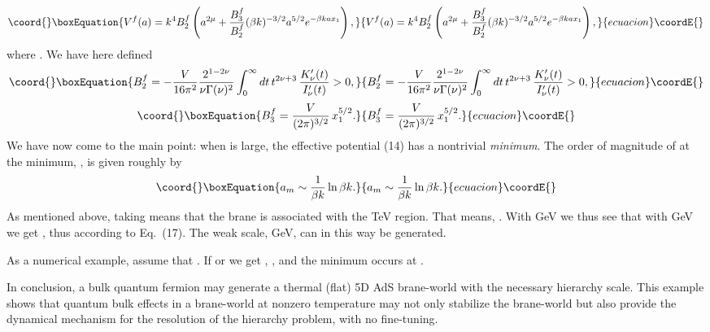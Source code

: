 \documentclass[a4paper,12pt]{article}
\begin{document}
\begin{equation}\coord{}\boxEquation{
V^f(a)=k^4 B_2^f\left( a^{2\mu}+\frac{B_3^f}{B_2^f}(\beta k)^{-3/2}a^{5/2}e^{-\beta kax_1} \right),
}{
V^f(a)=k^4 B_2^f\left( a^{2\mu}+\frac{B_3^f}{B_2^f}(\beta k)^{-3/2}a^{5/2}e^{-\beta kax_1} \right),
}{ecuacion}\coordE{}\end{equation}
\label{14}
where \coordHE{}. We have here defined
\begin{equation}\coord{}\boxEquation{
B_2^f=-\frac{V}{16\pi^2}\frac{2^{1-2\nu}}{\nu \Gamma(\nu)^2}\int_0^\infty dt\,t^{2\nu+3}\,\frac{K_\nu '(t)}{I_\nu '(t)} >0,
}{
B_2^f=-\frac{V}{16\pi^2}\frac{2^{1-2\nu}}{\nu \Gamma(\nu)^2}\int_0^\infty dt\,t^{2\nu+3}\,\frac{K_\nu '(t)}{I_\nu '(t)} >0,
}{ecuacion}\coordE{}\end{equation}
\label{15}
\begin{equation}\coord{}\boxEquation{
B_3^f=\frac{V}{(2\pi)^{3/2}}\,x_1^{5/2}.
}{
B_3^f=\frac{V}{(2\pi)^{3/2}}\,x_1^{5/2}.
}{ecuacion}\coordE{}\end{equation}
\label{16}
We have now come to the main point: when \coordHE{} is large, the effective potential (14) has a nontrivial {\it minimum}. The order of magnitude of \coordHE{} at the minimum, \coordHE{}, is given roughly by
\begin{equation}\coord{}\boxEquation{
a_m \sim \frac{1}{\beta k} \ln \beta k.
}{
a_m \sim \frac{1}{\beta k} \ln \beta k.
}{ecuacion}\coordE{}\end{equation}
\label{17}
As mentioned above, taking \coordHE{} means that the \myHighlight{$\phi=\pi$}\coordHE{} brane is associated with the TeV region. That means, \coordHE{}. With \coordHE{} GeV we thus see that with \coordHE{} GeV we get \coordHE{}, thus \coordHE{} according to Eq.~(17). The weak scale, \coordHE{} GeV, can in this way be generated.

As a numerical example, assume that \coordHE{}. If \coordHE{} or \coordHE{} we get \coordHE{}, \coordHE{}, and the minimum occurs at \coordHE{}. 

In conclusion, a bulk quantum fermion may generate a thermal (flat) 5D AdS brane-world with the necessary hierarchy scale. This example shows that quantum bulk effects in a brane-world \coordHE{} at nonzero temperature may not only stabilize the brane-world but also provide the dynamical mechanism for the resolution of the hierarchy problem, with no fine-tuning.
\end{document}
